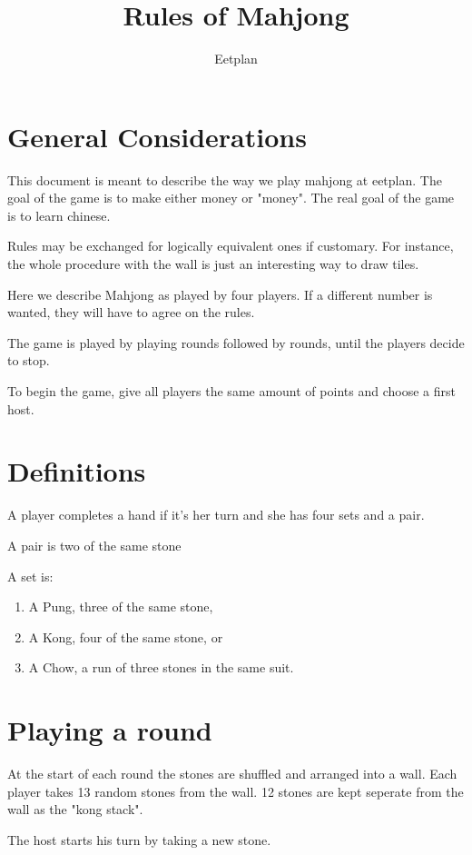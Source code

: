 \documentclass{article}
\begin{document}
\title{Rules of Mahjong}
\author{Eetplan}
\maketitle

\section{General Considerations}
This document is meant to describe the way we play mahjong at eetplan. The goal of the game is to make either money or "money". The real goal of the game is to learn chinese.

Rules may be exchanged for logically equivalent ones if customary. For instance, the whole procedure with the wall is just an interesting way to draw tiles.

Here we describe Mahjong as played by four players. If a different number is wanted, they will have to agree on the rules.

The game is played by playing rounds followed by rounds, until the players decide to stop.

To begin the game, give all players the same amount of points and choose a first host.

\section{Definitions}
A player completes a hand if it's her turn and she has four sets and a pair.

A pair is two of the same stone

A set is:
\begin{enumerate}
    \item A Pung, three of the same stone,
    \item A Kong, four of the same stone, or
    \item A Chow, a run of three stones in the same suit.
\end{enumerate}

\section{Playing a round}
At the start of each round the stones are shuffled and arranged into a wall. Each player takes 13 random stones from the wall. 12 stones are kept seperate from the wall as the "kong stack".

The host starts his turn by taking a new stone.
\end{document}
